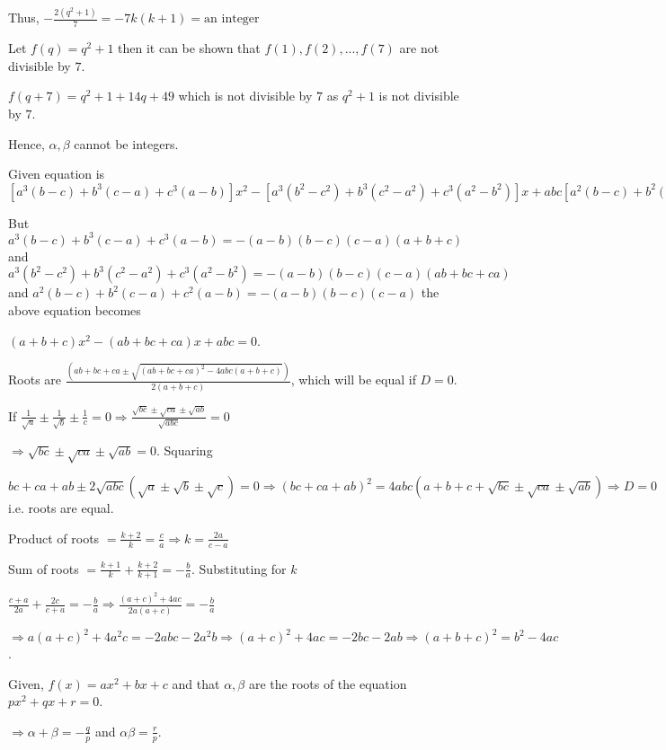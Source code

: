   Thus, $-\frac{2(q^2 + 1)}{7} = -7k(k + 1) = \text{an integer}$

  Let $f(q) = q^2 + 1$ then it can be shown that $f(1), f(2), ..., f(7)$ are not divisible by $7$.

  $f(q + 7) = q^2 + 1 + 14q + 49$ which is not divisible by $7$ as $q^2 + 1$ is not divisible by $7$.

  Hence, $\alpha, \beta$ cannot be integers.
\item Given equation is $[a^3(b - c) + b^3(c - a) + c^3(a - b)]x^2 - [a^3(b^2 - c^2) + b^3(c^2 - a^2) +
  c^3(a^2 - b^2)]x + abc[a^2(b - c) + b^2(c - a) + c^2(a - b)] = 0$

  But $a^3(b - c) + b^3(c - a) + c^3(a - b) = -(a - b)(b - c)(c - a)(a + b + c)$ and $a^3(b^2 - c^2) +
  b^3(c^2 - a^2) + c^3(a^2 - b^2) = -(a - b)(b - c)(c -a)(ab + bc + ca)$ and $a^2(b - c) + b^2(c - a) +
  c^2(a - b) = -(a - b)(b - c)(c - a)$ the above equation becomes

  $(a + b + c)x^2 - (ab + bc + ca)x + abc = 0$.

  Roots are $\frac{(ab + bc + ca \pm \sqrt{(ab + bc + ca)^2 - 4abc(a + b + c)})}{2(a + b + c)}$, which will
  be equal if $D = 0$.

  If $\frac{1}{\sqrt{a}}\pm \frac{1}{\sqrt{b}}\pm \frac{1}{c} = 0\Rightarrow \frac{\sqrt{bc} \pm \sqrt{ca}
    \pm \sqrt{ab}}{\sqrt{abc}} = 0$

  $\Rightarrow \sqrt{bc} \pm \sqrt{ca} \pm \sqrt{ab} = 0$. Squaring

  $bc + ca + ab \pm 2\sqrt{abc}(\sqrt{a}\pm \sqrt{b} \pm \sqrt{c}) = 0\Rightarrow (bc + ca + ab)^2 = 4abc(a
  + b + c + \sqrt{bc} \pm \sqrt{ca} \pm \sqrt{ab})\Rightarrow D = 0$ i.e. roots are equal.
\item Product of roots $= \frac{k + 2}{k} = \frac{c}{a}\Rightarrow k = \frac{2a}{c - a}$

  Sum of roots $= \frac{k + 1}{k} + \frac{k + 2}{k + 1} = -\frac{b}{a}$. Substituting for $k$

  $\frac{c + a}{2a} + \frac{2c}{c + a} = - \frac{b}{a}\Rightarrow \frac{(a + c)^2 + 4ac}{2a(a + c)} = -\frac{b}{a}$

  $\Rightarrow a(a + c)^2 + 4a^2c = -2abc - 2a^2b\Rightarrow (a + c)^2 + 4ac = -2bc - 2ab\Rightarrow (a + b
  + c)^2 = b^2 - 4ac$.
\item Given, $f(x) = ax^2 + bx + c$ and that $\alpha,\beta$ are the roots of the equation $px^2 + qx +
  r = 0$.

  $\Rightarrow \alpha + \beta = -\frac{q}{p}$ and $\alpha\beta = \frac{r}{p}$.


